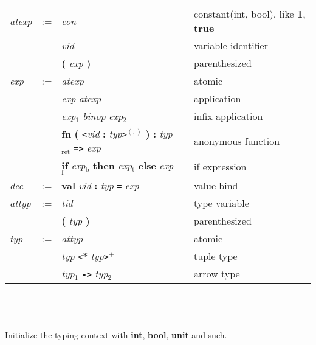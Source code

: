 \documentclass[12pt]{article}
\author{Andrey Yao}
\newcommand{\gm}[1]{\textit{#1}} %
\newcommand{\kw}[1]{\textbf{#1}} %
\newcommand{\hd}[1]{ \gm{#1} & := }
\newcommand{\row}[2]{ & #1 &  & #2\\}
\newcommand{\newrow}[2]{ & &#1 & &#2\\}
\begin{document}
\begin{tabular}{l l l l l}
  \hline %
  \hd{atexp}
  \row{\gm{con}}{constant(int, bool), like \kw{1}, \kw{true} }
  \newrow{\gm{vid}}{variable identifier}
  \newrow{\kw{(} \gm{exp} \kw{)}}{parenthesized}
  \hd{exp}
  \row{\gm{atexp}}{atomic}
  \newrow{\gm{exp} \gm{atexp}}{application}
  \newrow{\gm{exp}$_1$ \gm{binop} \gm{exp}$_2$}{infix application}
  \newrow{\kw{fn} \kw{(} \texttt{<}\gm{vid} \kw{:} \gm{typ}\texttt{>}$^{(,)}$ \kw{)} \kw{:} \gm{typ}$_\text{ret}$ \kw{\texttt{=>}} \gm{exp}}{anonymous function}
  \newrow{\kw{if} \gm{exp}$_\text{b}$ \kw{then} \gm{exp}$_\text{t}$ \kw{else} \gm{exp}$_\text{f}$}{if expression}
  \hd{dec}
  \row{\kw{val} \gm{vid} \kw{:} \gm{typ} \kw{\texttt{=}} \gm{exp}}{value bind}
  \hline %
  \hd{attyp}
  \row{\gm{tid}}{type variable}
  \newrow{\kw{(} \gm{typ} \kw{)}}{parenthesized}
  \hd{typ}
  \row{\gm{attyp}}{atomic}
  \newrow{\gm{typ} \texttt{<}{\bf$*$} \gm{typ}\texttt{>}$^+$}{tuple type}
  \newrow{\gm{typ}$_1$ \kw{\texttt{->}} \gm{typ}$_2$}{arrow type}
\end{tabular}
\\\\\\
Initialize the typing context with \kw{int}, \kw{bool}, \kw{unit} and such.
\end{document}

